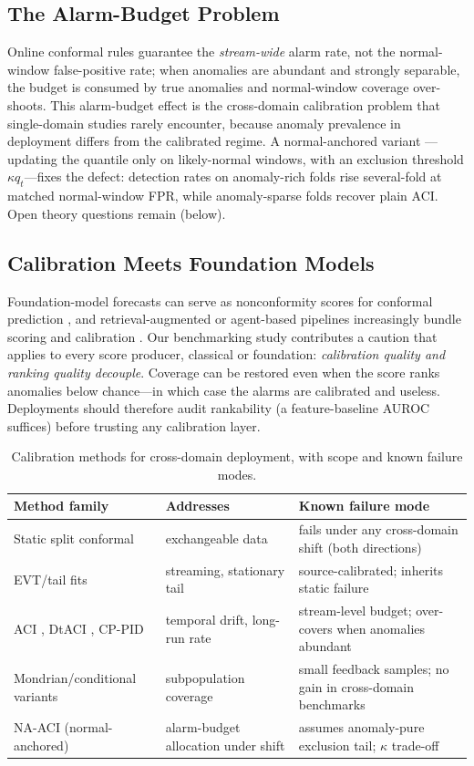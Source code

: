 \subsection{The Alarm-Budget Problem}
Online conformal rules guarantee the \emph{stream-wide} alarm rate, not the normal-window false-positive rate; when anomalies are abundant and strongly separable, the budget is consumed by true anomalies and normal-window coverage over-shoots. This alarm-budget effect is the cross-domain calibration problem that single-domain studies rarely encounter, because anomaly prevalence in deployment differs from the calibrated regime. A normal-anchored variant \cite{our_scc}---updating the quantile only on likely-normal windows, with an exclusion threshold $\kappa q_t$---fixes the defect: detection rates on anomaly-rich folds rise several-fold at matched normal-window FPR, while anomaly-sparse folds recover plain ACI. Open theory questions remain (below).

\subsection{Calibration Meets Foundation Models}
Foundation-model forecasts can serve as nonconformity scores for conformal prediction \cite{2507_08858}, and retrieval-augmented or agent-based pipelines increasingly bundle scoring and calibration \cite{2506_02081}. Our benchmarking study contributes a caution that applies to every score producer, classical or foundation: \emph{calibration quality and ranking quality decouple}. Coverage can be restored even when the score ranks anomalies below chance---in which case the alarms are calibrated and useless. Deployments should therefore audit rankability (a feature-baseline AUROC suffices) before trusting any calibration layer.

\begin{table}[t]
\caption{Calibration methods for cross-domain deployment, with scope and known failure modes.}
\label{tab:calibration}
\centering
\small
\begin{tabular}{p{2.3cm}p{2.4cm}p{2.9cm}}
\toprule
Method family & Addresses & Known failure mode \\
\midrule
Static split conformal \cite{lei2018} & exchangeable data & fails under any cross-domain shift (both directions) \\
EVT/tail fits \cite{siffer2017} & streaming, stationary tail & source-calibrated; inherits static failure \\
ACI \cite{aci2021}, DtACI \cite{dtaci2022}, CP-PID \cite{conformalpid2023} & temporal drift, long-run rate & stream-level budget; over-covers when anomalies abundant \\
Mondrian/conditional variants & subpopulation coverage & small feedback samples; no gain in cross-domain benchmarks \\
NA-ACI (normal-anchored) & alarm-budget allocation under shift & assumes anomaly-pure exclusion tail; $\kappa$ trade-off \\
\bottomrule
\end{tabular}
\end{table}
